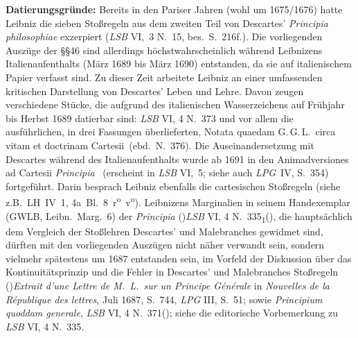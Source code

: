 \begin{ledgroup}
\footnotesize
\pstart
\noindent%
\textbf{Datierungsgründe:}
%
Bereits in den Pariser Jahren (wohl um 1675/1676) hatte Leibniz die sieben Stoßregeln aus dem zweiten Teil von
\protect{}Descartes' \cite{00035}\textit{Principia philosophiae} 
%
exzerpiert (\cite{01302}\textit{LSB} VI,~3 N.~15, bes.\ S.~216f.).
%
Die vorliegenden Auszüge der §§46 sind allerdings höchstwahrscheinlich während Leibnizens Italienaufenthalts (März 1689 bis März 1690) entstanden, da sie auf italienischem Papier verfasst sind.
%
Zu dieser Zeit arbeitete Leibniz an einer umfassenden kritischen Darstellung von
%
\protect{}Descartes' Leben und Lehre. 
%
Davon zeugen verschiedene Stücke, die aufgrund des italienischen Wasserzeichens 
%
auf Frühjahr bis Herbst 1689 datierbar sind: \textit{LSB} VI, 4 N.~373 
%
und vor allem die ausführlichen, in drei Fassungen überlieferten, 
%
\cite{02065}\glqq Notata quaedam G.\,G.\,L.\ circa vitam et doctrinam Cartesii\grqq\ (ebd.\ N.~376).
%
\pend
%
\pstart
Die Auseinandersetzung mit \protect{}Descartes
%
während des Italienaufenthalts wurde ab 1691 in den
%
\cite{02038}\glqq Anim\-adversiones ad Cartesii \textit{Principia}\grqq\
%
(erscheint in \textit{LSB} VI,~5; siehe auch \cite{02039}\textit{LPG}~IV, S.~354)
%
fortgeführt. 
%
Darin besprach Leibniz ebenfalls die cartesischen Stoßregeln (\cite{02038}siehe z.B.\ LH~IV~1, 4a~Bl.~8~r\textsuperscript{o}~v\textsuperscript{o}). 
%
\pend 
%
\pstart
%
Leibnizens Marginalien in seinem Handexemplar (GWLB, Leibn.\ Marg.~6) der \cite{00035}\textit{Principia} 
%
(\protect\vphantom)\cite{01301}\textit{LSB} VI, 4 N.~335\textsubscript{1}\protect\vphantom(),
%
die hauptsächlich dem Vergleich der Stoßlehren
\protect{}Descartes' 
%
und \protect{}Malebranches 
%
gewidmet sind,
%
dürften mit den vorliegenden Auszügen nicht näher verwandt sein, 
%
sondern vielmehr spätestens um 1687 entstanden sein,
%
im Vorfeld der Diskussion über das Kontinuitätsprinzip und die Fehler 
%
in \protect{}Descartes' 
%
und \protect{}Malebranches 
Stoßregeln 
%
(\protect\vphantom)\cite{02054}\textit{Extrait d'une Lettre de M.~L.\ sur un Principe Générale} in 
\cite{02002}\textit{Nouvelles de la République des lettres}, Juli 1687, S.~744\textendash753, \cite{02039}\textit{LPG} III, S.~51; sowie 
\cite{02055}\textit{Principium quoddam generale}, 
\textit{LSB} VI, 4 N.~371\protect\vphantom();
%
siehe die editorische Vorbemerkung zu \cite{01301}\textit{LSB} VI, 4 N.~335.
\pend
%
\end{ledgroup}
